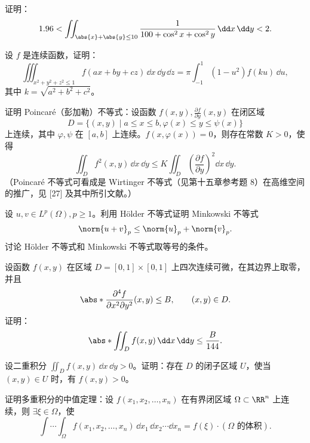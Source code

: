 \begin{xreferenceproblem}[4]
证明：
  \[
    1.96<\iint_{\abs{x}+\abs{y}\le10}\frac1{100+\cos^2x+\cos^2y}\,\dd x\,\dd y<2.
  \]
\end{xreferenceproblem}

\begin{xreferenceproblem}[5]
设 $f$ 是连续函数，证明：
  \[
    \iiint_{x^2+y^2+z^2\le1}f(ax+by+cz)\,\dd x\,\dd y\,\dd z
    =\pi\int_{-1}^1(1-u^2)f(ku)\,\dd u,
  \]
  其中 $k=\sqrt{a^2+b^2+c^2}$。
\end{xreferenceproblem}

\begin{xreferenceproblem}[6]
证明 Poincaré（彭加勒）不等式：设函数 $f(x,y),\frac{\partial f}{\partial y}(x,y)$ 在闭区域
  \[
    D=\{(x,y)\mid a\le x\le b,\varphi(x)\le y\le\psi(x)\}
  \]
  上连续，其中 $\varphi,\psi$ 在 $[a,b]$ 上连续。$f(x,\varphi(x))=0$，则存在常数 $K>0$，使得
  \[
    \iint_D f^2(x,y)\,\dd x\,\dd y\le K\iint_D\left(\frac{\partial f}{\partial y}\right)^2\dd x\,\dd y.
  \]
  （Poincaré 不等式可看成是 Wirtinger 不等式（见第十五章参考题 8）在高维空间的推广，见 [27] 及其中所引文献。）
\end{xreferenceproblem}

\begin{xreferenceproblem}[7]
设 $u,v\in L^p(\Omega),p\ge1$。利用 Hölder 不等式证明 Minkowski 不等式
  \[
    \norm{u+v}_p\le\norm{u}_p+\norm{v}_p.
  \]
  讨论 Hölder 不等式和 Minkowski 不等式取等号的条件。
\end{xreferenceproblem}

\begin{xreferenceproblem}[8]
设函数 $f(x,y)$ 在区域 $D=[0,1]\times[0,1]$ 上四次连续可微，在其边界上取零，并且
  \[
    \abs*{\frac{\partial^4f}{\partial x^2\partial y^2}(x,y)}\le B,
    \qquad(x,y)\in D.
  \]
  证明：
  \[
    \abs*{\iint_D f(x,y)\,\dd x\,\dd y}\le\frac B{144}.
  \]
\end{xreferenceproblem}

\begin{xreferenceproblem}[9]
设二重积分 $\iint_Df(x,y)\,\dd x\,\dd y>0$。证明：存在 $D$ 的闭子区域 $U$，使当 $(x,y)\in U$ 时，有 $f(x,y)>0$。
\end{xreferenceproblem}

\begin{xreferenceproblem}[10]
证明多重积分的中值定理：设 $f(x_1,x_2,\ldots,x_n)$ 在有界闭区域 $\Omega\subset\RR^n$ 上连续，则 $\exists\xi\in\Omega$，使
  \[
    \int\cdots\int_\Omega f(x_1,x_2,\ldots,x_n)\,\dd x_1\,\dd x_2\cdots\dd x_n
    =f(\xi)\cdot(\Omega\text{ 的体积}).
  \]
\end{xreferenceproblem}

